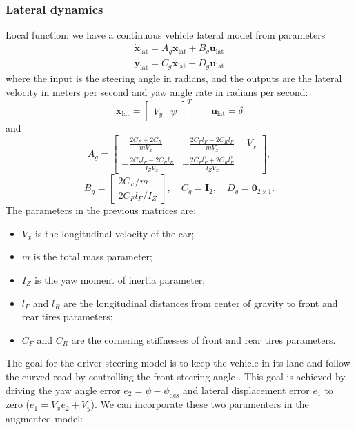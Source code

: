 \documentclass[conference, 11pt]{IEEEtran}
\begin{document}
\subsubsection{Lateral dynamics}
Local function: we have a continuous vehicle lateral model from parameters
\begin{equation}
\label{eqn:lateral_dynamics_simple_model}
\begin{array}{ll}
\dot{\textbf{x}}_{\text{lat}} =A_g \textbf{x}_{\text{lat}}+ B_g \textbf{u}_{\text{lat}}\\
\textbf{y}_{\text{lat}} =C_g \textbf{x}_{\text{lat}} + D_g \textbf{u}_{\text{lat}}
\end{array}
\end{equation}
where the input is the steering angle in radians, and the outputs are the lateral velocity in meters per second and yaw angle rate in radians per second:
\begin{equation*}
\textbf{x}_{\text{lat}} = \begin{bmatrix}
V_y&\dot{\psi}
\end{bmatrix}^T
\qquad
\textbf{u}_{\text{lat}} = \delta
\end{equation*}
and
\[ 
A_g=\begin{bmatrix}
-\frac{2C_F+2C_R}{mV_x}&-\frac{2C_Fl_F-2C_Rl_R}{mV_x} - V_x\\
-\frac{2C_Fl_F-2C_Rl_R}{I_ZV_x}&-\frac{2C_Fl_F^2+2C_Rl_R^2}{I_ZV_x}
\end{bmatrix},
\]
\[
B_g=\begin{bmatrix}
2C_F/m\\
2C_Fl_F/I_Z
\end{bmatrix},
\quad
C_g=\textbf{I}_2, 
\quad
D_g=\textbf{0}_{2\times1}.
\]
The parameters in the previous matrices are:
\begin{itemize}
	\item $V_x$ is the longitudinal velocity of the car;	
	\item $m$ is the total mass parameter; 
	\item $I_Z$ is the yaw moment of inertia parameter;
	\item $l_F$ and $l_R$ are the longitudinal distances from center of gravity to front and rear tires parameters;
	\item $C_F$ and $C_R$ are the cornering stiffnesses of front and rear tires parameters.
\end{itemize}
The goal for the driver steering model is to keep the vehicle in its lane and follow the curved road by controlling the front steering angle . This goal is achieved by driving the yaw angle error $e_2 = \psi -\psi_{\text{des}}$ and lateral displacement error $e_1$ to zero ($\dot{e}_1 = V_xe_2+V_y$). We can incorporate these two paramenters in the augmented model:
\end{document}
